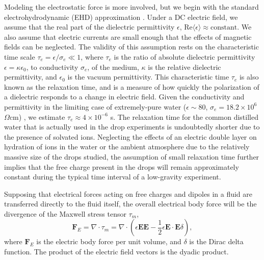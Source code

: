 \documentclass[12pt,a4paper,oneside]{book}
\begin{document}
Modeling the electrostatic force is more involved, but we begin with the standard electrohydrodynamic (EHD) approximation \cite{saville_electrohydrodynamics:_1997}. Under a DC electric field, we assume that the real part of the dielectric permittivity $\epsilon$, $\mbox{Re} \langle \epsilon \rangle \approx  \mbox{constant}$. We also assume that electric currents are small enough that the effects of magnetic fields can be neglected. The validity of this assumption rests on the characteristic time scale $\tau_e = \epsilon /\sigma_e \ll 1$, where $\tau_e$ is the ratio of absolute dielectric permittivity $\epsilon = \kappa \epsilon_0$, to conductivity $\sigma_e$, of the medium, $\kappa$ is the relative dielectric permittivity, and $\epsilon_0$ is the vacuum permittivity. This characteristic time $\tau_e$ is also known as the relaxation time, and is a measure of how quickly the polarization of a dielectric responds to a change in electric field. Given the conductivity and permittivity in the limiting case of extremely-pure water ($ \epsilon \sim 80$, $\sigma_e = 18.2 \times 10^{6}$ $\Omega\mbox{cm}$) \cite{yatsuzuka_electrification_1994}, we estimate $\tau_e \approx 4 \times 10^{-6}$ s. The relaxation time for the common distilled water that is actually used in the drop experiments is undoubtedly shorter due to the presence of solvated ions. Neglecting the effects of an electric double layer on hydration of ions in the water or the ambient atmosphere due to the relatively massive size of the drops studied, the assumption of small relaxation time further implies that the free charge present in the drops will remain approximately constant during the typical time interval of a low-gravity experiment.

Supposing that electrical forces acting on free charges and dipoles in a fluid are transferred directly to the fluid itself, the overall electrical body force will be the divergence of the Maxwell stress tensor $\tau_m $,
\[ \mathbf{F}_E = \nabla \cdot \tau_m = \nabla \cdot \left( \epsilon \mathbf{E} \mathbf{E} - \frac{1}{2} \epsilon \mathbf{E} \cdot \mathbf{E} \delta \right) ,\]
where $\mathbf{F}_E$ is the electric body force per unit volume, and $\delta$ is the Dirac delta function. The product of the electric field vectors is the dyadic product.  
\end{document}

